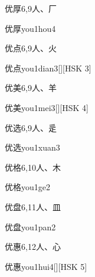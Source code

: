 \begin{Entry}{优厚}{6,9}{⼈、⼚}
  \begin{Phonetics}{优厚}{you1hou4}
  \end{Phonetics}
\end{Entry}

\begin{Entry}{优点}{6,9}{⼈、⽕}
  \begin{Phonetics}{优点}{you1dian3}[][HSK 3]
  \end{Phonetics}
\end{Entry}

\begin{Entry}{优美}{6,9}{⼈、⽺}
  \begin{Phonetics}{优美}{you1mei3}[][HSK 4]
  \end{Phonetics}
\end{Entry}

\begin{Entry}{优选}{6,9}{⼈、⾡}
  \begin{Phonetics}{优选}{you1xuan3}
  \end{Phonetics}
\end{Entry}

\begin{Entry}{优格}{6,10}{⼈、⽊}
  \begin{Phonetics}{优格}{you1ge2}
  \end{Phonetics}
\end{Entry}

\begin{Entry}{优盘}{6,11}{⼈、⽫}
  \begin{Phonetics}{优盘}{you1pan2}
  \end{Phonetics}
\end{Entry}

\begin{Entry}{优惠}{6,12}{⼈、⼼}
  \begin{Phonetics}{优惠}{you1hui4}[][HSK 5]
  \end{Phonetics}
\end{Entry}

